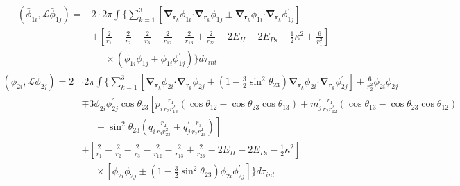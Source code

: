 \documentclass[Dissertation.tex]{subfiles}
\begin{document}
\begin{align}
\label{eq:DWavePhi1Phi1}
\left(\bar{\phi}_{1i},\mathcal{L} \bar{\phi}_{1j}\right) = &2 \cdot 2\pi \int{ \Bigg\{ \sum_{k=1}^3 \left[ \boldsymbol{\nabla}_{\!\mathbf{r}_k} \nonumber \phi_{1i} \boldsymbol{\cdot} \boldsymbol{\nabla}_{\!\mathbf{r}_k} \phi_{1j} \pm \boldsymbol{\nabla}_{\!\mathbf{r}_k} \phi_{1i} \boldsymbol{\cdot} \boldsymbol{\nabla}_{\!\mathbf{r}_k} \phi_{1j}^\prime \right] } \\
\nonumber  &+ \left. \left[\frac{2}{r_1} - \frac{2}{r_2} - \frac{2}{r_3} - \frac{2}{r_{12}} - \frac{2}{r_{13}} + \frac{2}{r_{23}} - 2 E_H - 2 E_{Ps} - \frac{1}{2}\kappa^2 + \frac{6}{r_1^2} \right] \right. \\
 &\;\;\;\;\; \times \left(\phi_{1i} \phi_{1j} \pm \phi_{1i} \phi_{1j}^\prime \right) \Bigg\} d\tau_{int}
\end{align}
\begin{align}
\label{eq:DWavePhi2Phi2}
\left(\bar{\phi}_{2i},\mathcal{L} \bar{\phi}_{2j}\right) = 2 & \cdot 2\pi \int \Bigg\{ \sum_{k=1}^3 \left[ \boldsymbol{\nabla}_{\!\mathbf{r}_k} \nonumber \phi_{2i} \boldsymbol{\cdot} \boldsymbol{\nabla}_{\!\mathbf{r}_k} \phi_{2j} \pm \left(1-\tfrac{3}{2}\sin^2\theta_{23}\right) \boldsymbol{\nabla}_{\!\mathbf{r}_k} \phi_{2i} \boldsymbol{\cdot} \boldsymbol{\nabla}_{\!\mathbf{r}_k} \phi_{2j}^\prime \right]  + \frac{6}{r_2^2}\phi_{2i}\phi_{2j} \\
 \nonumber &\mp 3 \phi_{2i} \phi_{2j}^\prime \cos\theta_{23} \left[p_i \frac{r_1}{r_3 r_{13}^2} (\cos\theta_{12} - \cos\theta_{23} \cos\theta_{13}) + m_j^\prime \frac{r_1}{r_2 r_{12}^2}(\cos\theta_{13} - \cos\theta_{23} \cos\theta_{12})\right.\\
 \nonumber & \left. \;\;\;\;\;  + \sin^2\theta_{23} \left(q_i \frac{r_2}{r_3 r_{23}^2} + q_j^\prime \frac{r_3}{r_2 r_{23}^2} \right) \right] \\
 \nonumber &+ \left. \left[\frac{2}{r_1} - \frac{2}{r_2} - \frac{2}{r_3} - \frac{2}{r_{12}} - \frac{2}{r_{13}} + \frac{2}{r_{23}} - 2 E_H - 2 E_{Ps} - \frac{1}{2}\kappa^2 \right] \right. \\
 &\;\;\;\;\; \times \left[\phi_{2i} \phi_{2j} \pm \left(1-\tfrac{3}{2}\sin^2\theta_{23}\right) \phi_{2i} \phi_{2j}^\prime \right] \Bigg\} d\tau_{int}
\end{align}
\end{document}
